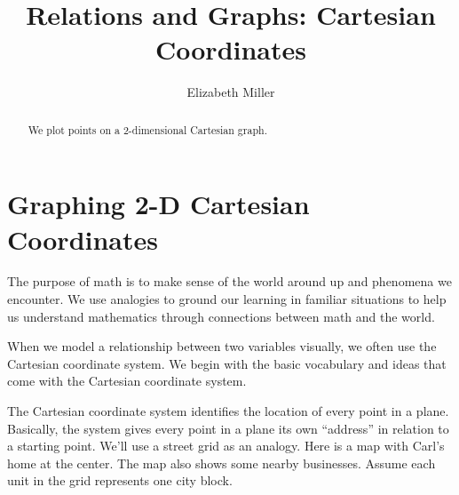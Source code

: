 \documentclass{ximera}
\author{Elizabeth Miller}
\title{Relations and Graphs: Cartesian Coordinates}
\begin{document}
\begin{abstract}
We plot points on a 2-dimensional Cartesian graph.  
\end{abstract}
\maketitle
\licenseORCCA


\section{Graphing 2-D Cartesian Coordinates} 

\begin{MM}
The purpose of math is to make sense of the world around up and phenomena we encounter. We use analogies to ground our learning in familiar situations to help us understand mathematics through connections between math and the world.
\end{MM}

When we model a relationship between two variables visually, we often use the Cartesian coordinate system. We begin with the basic vocabulary and ideas that come with the Cartesian coordinate system.

The Cartesian coordinate system identifies the location of every point in a plane. Basically, the system gives every point in a plane its own ``address'' in relation to a starting point. We'll use a street grid as an analogy. Here is a map with Carl's home at the center. The map also shows some nearby businesses. Assume each unit in the grid represents one city block.

\begin{image}
\end{image}
\end{document}
